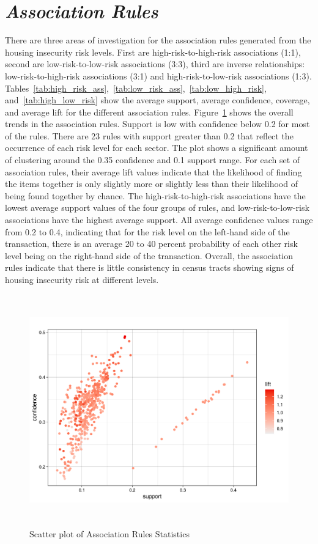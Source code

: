 \section{\textit{Association Rules}}

There are three areas of investigation for the association rules generated from the housing insecurity risk levels. First are high-risk-to-high-risk associations (1:1), second are low-risk-to-low-risk associations (3:3), third are inverse relationships: low-risk-to-high-risk associations (3:1) and high-risk-to-low-risk associations (1:3). Tables~\ref{tab:high_risk_ass},~\ref{tab:low_risk_ass},~\ref{tab:low_high_risk}, and~\ref{tab:high_low_risk} show the average support, average confidence, coverage, and average lift for the different association rules. Figure~\ref{fig:assoc_scatter} shows the overall trends in the association rules. Support is low with confidence below 0.2 for most of the rules.  There are 23 rules with support greater than 0.2 that reflect the occurrence of each risk level for each sector. The plot shows a significant amount of clustering around the 0.35 confidence and 0.1 support range. For each set of association rules, their average lift values indicate that the likelihood of finding the items together is only slightly more or slightly less than their likelihood of being found together by chance. The high-risk-to-high-risk associations have the lowest average support values of the four groups of rules, and low-risk-to-low-risk associations have the highest average support. All average confidence values range from 0.2 to 0.4, indicating that for the risk level on the left-hand side of the transaction, there is an average 20 to 40 percent probability of each other risk level being on the right-hand side of the transaction. Overall, the association rules indicate that there is little consistency in census tracts showing signs of housing insecurity risk at different levels. 


 \begin{figure}[htbp]
    \centering
     \includegraphics[width=1\textwidth, height=10cm]{plots/assoc_scatter.png}
     \caption{Scatter plot of Association Rules Statistics}
     \label{fig:assoc_scatter}
 \end{figure}

